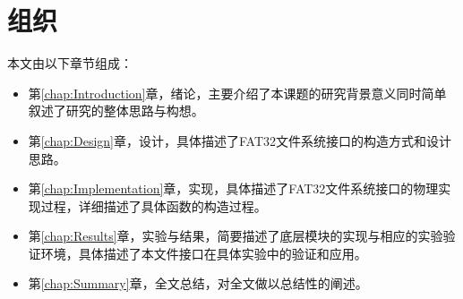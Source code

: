 \section{组织}
\label{sec:Orgnization}
本文由以下章节组成：
\begin{itemize}
    \item 第\ref{chap:Introduction}章，绪论，主要介绍了本课题的研究背景意义同时简单叙述了研究的整体思路与构想。
    \item 第\ref{chap:Design}章，设计，具体描述了FAT32文件系统接口的构造方式和设计思路。
    \item 第\ref{chap:Implementation}章，实现，具体描述了FAT32文件系统接口的物理实现过程，详细描述了具体函数的构造过程。
    \item 第\ref{chap:Results}章，实验与结果，简要描述了底层模块的实现与相应的实验验证环境，具体描述了本文件接口在具体实验中的验证和应用。
    \item 第\ref{chap:Summary}章，全文总结，对全文做以总结性的阐述。
\end{itemize}

